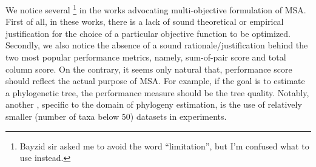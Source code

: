 We notice several  \footnote{Bayzid sir asked me to avoid the word ``limitation'', but I'm confused what to use instead.} in the works advocating multi-objective formulation of MSA. First of all, in these works, there is a lack of sound theoretical or empirical justification for the choice of a particular objective function to be optimized. Secondly, we also notice the absence of a sound rationale/justification behind the two most popular performance metrics, namely, sum-of-pair score and total column score. On the contrary, it seems only natural that, performance score should reflect the actual purpose of MSA. For example, if the goal is to estimate a phylogenetic tree, the performance measure should be the tree quality. Notably, another , specific to the domain of phylogeny estimation, is the use of relatively smaller (number of taxa below 50) datasets in experiments. 

